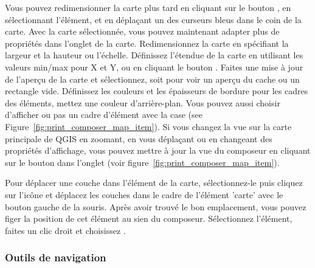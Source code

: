 Vous pouvez redimensionner la carte plus tard en cliquant sur le bouton , en sélectionnant
l'élément, et en déplaçant un des curseurs bleus dans le coin de la carte. Avec la carte sélectionnée, vous pouvez maintenant adapter plus de propriétés dans l'onglet  de la carte. Redimensionnez la carte en spécifiant la largeur et la hauteur ou l'échelle. Définissez l'étendue de la carte en utilisant les valeurs min/max pour X et Y, ou en cliquant le bouton . Faites une mise à jour de l'aperçu de la carte et sélectionnez, soit pour voir un aperçu du cache ou un rectangle vide. Définissez les couleurs et les épaisseurs de bordure pour les cadres des éléments, mettez une couleur d'arrière-plan. Vous pouvez aussi choisir d'afficher ou pas un cadre d'élément avec la case  (see Figure~\ref{fig:print_composer_map_item}). Si vous changez la vue sur la carte principale de QGIS en zoomant, en vous déplaçant ou en changeant des propriétés d'affichage, vous pouvez mettre à jour la vue du composeur en cliquant sur le bouton  dans l'onglet  (voir figure~\ref{fig:print_composer_map_item}). 

Pour déplacer une couche dans l'élément de la carte, sélectionnez-le puis cliquez sur l'icône  et déplacez les couches dans le cadre de l'élément 'carte' avec le bouton gauche de la souris.
Après avoir trouvé le bon emplacement, vous pouvez figer la position de cet élément au sien du composeur. Sélectionnez l'élément, faites un clic droit et choisissez .

\subsubsection{Outils de navigation}

